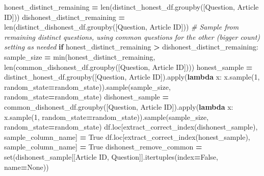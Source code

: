 \documentclass[
]{article}
\newenvironment{Shaded}{\begin{snugshade}}{\end{snugshade}}
\newcommand{\BuiltInTok}[1]{#1}
\newcommand{\CommentTok}[1]{\textcolor[rgb]{0.56,0.35,0.01}{\textit{#1}}}
\newcommand{\ControlFlowTok}[1]{\textcolor[rgb]{0.13,0.29,0.53}{\textbf{#1}}}
\newcommand{\DecValTok}[1]{\textcolor[rgb]{0.00,0.00,0.81}{#1}}
\newcommand{\KeywordTok}[1]{\textcolor[rgb]{0.13,0.29,0.53}{\textbf{#1}}}
\newcommand{\NormalTok}[1]{#1}
\newcommand{\OperatorTok}[1]{\textcolor[rgb]{0.81,0.36,0.00}{\textbf{#1}}}
\newcommand{\StringTok}[1]{\textcolor[rgb]{0.31,0.60,0.02}{#1}}
\newcommand{\VariableTok}[1]{\textcolor[rgb]{0.00,0.00,0.00}{#1}}
\begin{document}
\begin{Shaded}
\begin{Highlighting}[]
\NormalTok{    honest\_distinct\_remaining }\OperatorTok{=} \BuiltInTok{len}\NormalTok{(distinct\_honest\_df.groupby([}\StringTok{\textquotesingle{}Question\textquotesingle{}}\NormalTok{, }\StringTok{\textquotesingle{}Article ID\textquotesingle{}}\NormalTok{]))}
\NormalTok{    dishonest\_distinct\_remaining }\OperatorTok{=} \BuiltInTok{len}\NormalTok{(distinct\_dishonest\_df.groupby([}\StringTok{\textquotesingle{}Question\textquotesingle{}}\NormalTok{, }\StringTok{\textquotesingle{}Article ID\textquotesingle{}}\NormalTok{]))}
    \CommentTok{\# Sample from remaining distinct questions, using common questions for the other (bigger count) setting as needed}
    \ControlFlowTok{if}\NormalTok{ honest\_distinct\_remaining }\OperatorTok{\textgreater{}}\NormalTok{ dishonest\_distinct\_remaining:}
\NormalTok{        sample\_size }\OperatorTok{=} \BuiltInTok{min}\NormalTok{(honest\_distinct\_remaining, }\BuiltInTok{len}\NormalTok{(common\_dishonest\_df.groupby([}\StringTok{\textquotesingle{}Question\textquotesingle{}}\NormalTok{, }\StringTok{\textquotesingle{}Article ID\textquotesingle{}}\NormalTok{])))}
\NormalTok{        honest\_sample }\OperatorTok{=}\NormalTok{ distinct\_honest\_df.groupby([}\StringTok{\textquotesingle{}Question\textquotesingle{}}\NormalTok{, }\StringTok{\textquotesingle{}Article ID\textquotesingle{}}\NormalTok{]).}\BuiltInTok{apply}\NormalTok{(}\KeywordTok{lambda}\NormalTok{ x: x.sample(}\DecValTok{1}\NormalTok{, random\_state}\OperatorTok{=}\NormalTok{random\_state)).sample(sample\_size, random\_state}\OperatorTok{=}\NormalTok{random\_state)}
\NormalTok{        dishonest\_sample }\OperatorTok{=}\NormalTok{ common\_dishonest\_df.groupby([}\StringTok{\textquotesingle{}Question\textquotesingle{}}\NormalTok{, }\StringTok{\textquotesingle{}Article ID\textquotesingle{}}\NormalTok{]).}\BuiltInTok{apply}\NormalTok{(}\KeywordTok{lambda}\NormalTok{ x: x.sample(}\DecValTok{1}\NormalTok{, random\_state}\OperatorTok{=}\NormalTok{random\_state)).sample(sample\_size, random\_state}\OperatorTok{=}\NormalTok{random\_state)}
\NormalTok{        df.loc[extract\_correct\_index(dishonest\_sample), sample\_column\_name] }\OperatorTok{=} \VariableTok{True}
\NormalTok{        df.loc[extract\_correct\_index(honest\_sample), sample\_column\_name] }\OperatorTok{=} \VariableTok{True}
\NormalTok{        dishonest\_remove\_common }\OperatorTok{=} \BuiltInTok{set}\NormalTok{(dishonest\_sample[[}\StringTok{\textquotesingle{}Article ID\textquotesingle{}}\NormalTok{, }\StringTok{\textquotesingle{}Question\textquotesingle{}}\NormalTok{]].itertuples(index}\OperatorTok{=}\VariableTok{False}\NormalTok{, name}\OperatorTok{=}\VariableTok{None}\NormalTok{))}

\end{Highlighting}
\end{Shaded}
\end{document}
